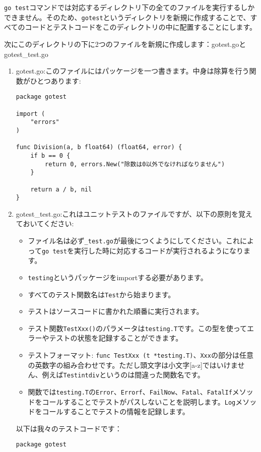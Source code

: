 \texttt{go test}コマンドでは対応するディレクトリ下の全てのファイルを実行するしかできません。そのため、\texttt{gotest}というディレクトリを新規に作成することで、すべてのコードとテストコードをこのディレクトリの中に配置することにします。

次にこのディレクトリの下に2つのファイルを新規に作成します：gotest.goとgotest\_test.go

\begin{enumerate}
\item gotest.go:このファイルにはパッケージを一つ書きます。中身は除算を行う関数がひとつあります:\\
\begin{lstlisting}[numbers=none]
package gotest

import (
    "errors"
)

func Division(a, b float64) (float64, error) {
    if b == 0 {
        return 0, errors.New("除数は0以外でなければなりません")
    }

    return a / b, nil
}
\end{lstlisting}
  \item gotest\_test.go:これはユニットテストのファイルですが、以下の原則を覚えておいてください:
\begin{itemize}
  \item ファイル名は必ず\texttt{\_test.go}が最後につくようにしてください。これによって\texttt{go test}を実行した時に対応するコードが実行されるようになります。
  \item \texttt{testing}というパッケージをimportする必要があります。
  \item すべてのテスト関数名は\texttt{Test}から始まります。
  \item テストはソースコードに書かれた順番に実行されます。
  \item テスト関数\texttt{TestXxx()}のパラメータは\texttt{testing.T}です。この型を使ってエラーやテストの状態を記録することができます。
  \item テストフォーマット: \texttt{func TestXxx (t *testing.T)}、\texttt{Xxx}の部分は任意の英数字の組み合わせです。ただし頭文字は小文字[a-z]ではいけません、例えば\texttt{Testintdiv}というのは間違った関数名です。
  \item 関数では\texttt{testing.T}の\texttt{Error}、\texttt{Errorf}、\texttt{FailNow}、\texttt{Fatal}、\texttt{FatalIf}メソッドをコールすることでテストがパスしないことを説明します。\texttt{Log}メソッドをコールすることでテストの情報を記録します。
\end{itemize}
以下は我々のテストコードです：
\begin{lstlisting}[numbers=none]
 package gotest


\end{lstlisting}
\end{enumerate}
